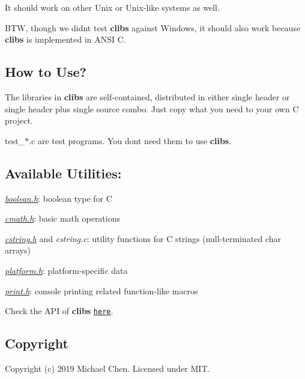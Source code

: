 It should work on other Unix or Unix-\/like systems as well.

B\+TW, though we didn\textquotesingle{}t test {\bfseries clibs} against Windows, it should also work because {\bfseries clibs} is implemented in A\+N\+SI C.

\subsection*{How to Use?}

The libraries in {\bfseries clibs} are self-\/contained, distributed in either single header or single header plus single source combo. Just copy what you need to your own C project.

test\+\_\+$\ast$.c are test programs. You don\textquotesingle{}t need them to use {\bfseries clibs}.

\subsection*{Available Utilities\+:}


\begin{DoxyItemize}
\item {\itshape \hyperlink{boolean_8h}{boolean.\+h}}\+: boolean type for C
\item {\itshape \hyperlink{cmath_8h}{cmath.\+h}}\+: basic math operations
\item {\itshape \hyperlink{cstring_8h}{cstring.\+h}} and {\itshape cstring.\+c}\+: utility functions for C strings (null-\/terminated {\ttfamily char} arrays)
\item {\itshape \hyperlink{platform_8h}{platform.\+h}}\+: platform-\/specific data
\item {\itshape \hyperlink{print_8h}{print.\+h}}\+: console printing related function-\/like macros
\end{DoxyItemize}

Check the A\+PI of {\bfseries clibs} \href{https://cwchentw.github.io/clibs/html/index.html}{\tt here}.

\subsection*{Copyright}

Copyright (c) 2019 Michael Chen. Licensed under M\+IT. 